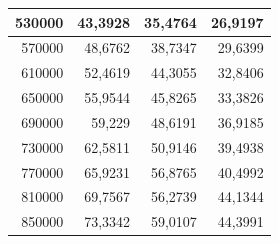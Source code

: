 \documentclass[a4paper, 12pt]{article}
\begin{document}
\begin{longtable}[c]{@{}rrrr@{}}
	\multicolumn{1}{|r|}{530000}                  & \multicolumn{1}{r|}{43,3928}                & \multicolumn{1}{r|}{35,4764}                                                           & \multicolumn{1}{r|}{26,9197}                                                           \\* \midrule
	\multicolumn{1}{|r|}{570000}                  & \multicolumn{1}{r|}{48,6762}                & \multicolumn{1}{r|}{38,7347}                                                           & \multicolumn{1}{r|}{29,6399}                                                           \\* \midrule
	\multicolumn{1}{|r|}{610000}                  & \multicolumn{1}{r|}{52,4619}                & \multicolumn{1}{r|}{44,3055}                                                           & \multicolumn{1}{r|}{32,8406}                                                           \\* \midrule
	\multicolumn{1}{|r|}{650000}                  & \multicolumn{1}{r|}{55,9544}                & \multicolumn{1}{r|}{45,8265}                                                           & \multicolumn{1}{r|}{33,3826}                                                           \\* \midrule
	\multicolumn{1}{|r|}{690000}                  & \multicolumn{1}{r|}{59,229}                 & \multicolumn{1}{r|}{48,6191}                                                           & \multicolumn{1}{r|}{36,9185}                                                           \\* \midrule
	\multicolumn{1}{|r|}{730000}                  & \multicolumn{1}{r|}{62,5811}                & \multicolumn{1}{r|}{50,9146}                                                           & \multicolumn{1}{r|}{39,4938}                                                           \\* \midrule
	\multicolumn{1}{|r|}{770000}                  & \multicolumn{1}{r|}{65,9231}                & \multicolumn{1}{r|}{56,8765}                                                           & \multicolumn{1}{r|}{40,4992}                                                           \\* \midrule
	\multicolumn{1}{|r|}{810000}                  & \multicolumn{1}{r|}{69,7567}                & \multicolumn{1}{r|}{56,2739}                                                           & \multicolumn{1}{r|}{44,1344}                                                           \\* \midrule
	\multicolumn{1}{|r|}{850000}                  & \multicolumn{1}{r|}{73,3342}                & \multicolumn{1}{r|}{59,0107}                                                           & \multicolumn{1}{r|}{44,3991}                                                           \\* \midrule

\end{longtable}
\end{document}
